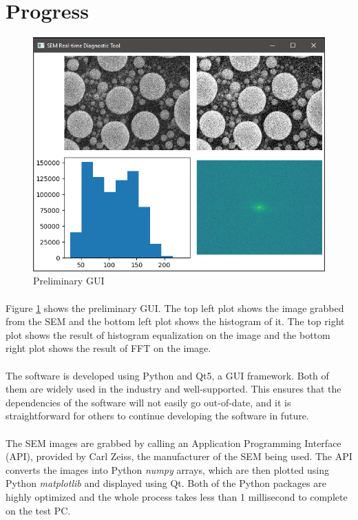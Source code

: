 \documentclass[12pt,a4paper]{article}
\begin{document}
\section{Progress}
\begin{figure}[h!]
  \centering
  \includegraphics[scale=0.8]{"GUI"}
  \caption{Preliminary GUI}
  \label{fig:GUI}
\end{figure}

\paragraph{}
Figure \ref{fig:GUI} shows the preliminary GUI. The top left plot shows the image grabbed from the SEM and the bottom left plot shows the histogram of it. The top right plot shows the result of histogram equalization on the image and the bottom right plot shows the result of FFT on the image.

\paragraph{}
The software is developed using Python and Qt5, a GUI framework. Both of them are widely used in the industry and well-supported. This ensures that the dependencies of the software will not easily go out-of-date, and it is straightforward for others to continue developing the software in future.

\paragraph{}
The SEM images are grabbed by calling an Application Programming Interface (API), provided by Carl Zeiss, the manufacturer of the SEM being used. The API converts the images into Python \textit{numpy} arrays, which are then plotted using Python \textit{matplotlib} and displayed using Qt. Both of the Python packages are highly optimized and the whole process takes less than 1 millisecond to complete on the test PC.
\end{document}
